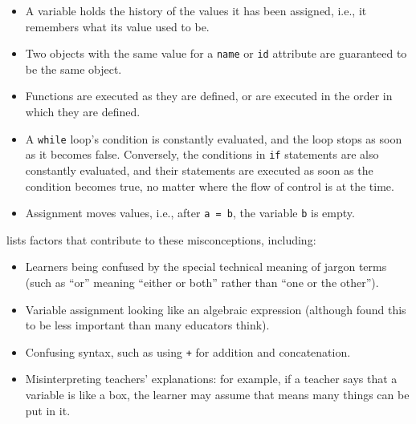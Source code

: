 \begin{itemize}

\item
  A variable holds the history of the values it has been assigned,
  i.e., it remembers what its value used to be.

\item
  Two objects with the same value for a \texttt{name} or \texttt{id}
  attribute are guaranteed to be the same object.

\item
  Functions are executed as they are defined, or are executed in the
  order in which they are defined.

\item
  A \texttt{while} loop's condition is constantly evaluated, and the
  loop stops as soon as it becomes false.  Conversely, the conditions
  in \texttt{if} statements are also constantly evaluated, and their
  statements are executed as soon as the condition becomes true, no
  matter where the flow of control is at the time.

\item
  Assignment moves values, i.e., after \texttt{a = b}, the variable
  \texttt{b} is empty.

\end{itemize}

\cite{Qian2017} lists factors that contribute to these misconceptions,
including:

\begin{itemize}

\item
  Learners being confused by the special technical meaning of jargon
  terms (such as ``or'' meaning ``either or both'' rather than ``one
  or the other'').

\item
  Variable assignment looking like an algebraic expression (although
  \cite{Alta2015} found this to be less important than many
  educators think).

\item
  Confusing syntax, such as using \texttt{+} for addition and
  concatenation.

\item
  Misinterpreting teachers' explanations: for example, if a teacher
  says that a variable is like a box, the learner may assume that
  means many things can be put in it.

\end{itemize}

